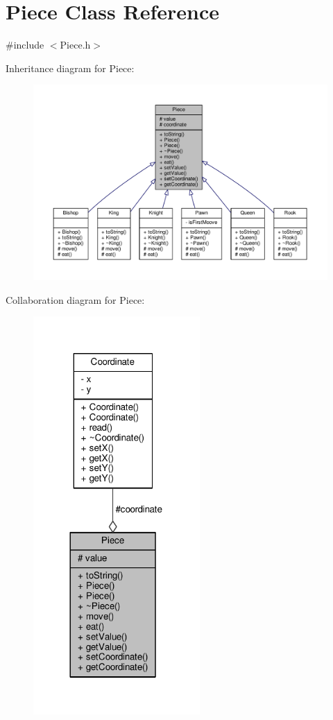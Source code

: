 \hypertarget{class_piece}{}\section{Piece Class Reference}
\label{class_piece}


{\ttfamily \#include $<$Piece.\+h$>$}



Inheritance diagram for Piece\+:\nopagebreak
\begin{figure}[H]
\begin{center}
\leavevmode
\includegraphics[width=350pt]{class_piece__inherit__graph}
\end{center}
\end{figure}


Collaboration diagram for Piece\+:\nopagebreak
\begin{figure}[H]
\begin{center}
\leavevmode
\includegraphics[width=180pt]{class_piece__coll__graph}
\end{center}
\end{figure}
